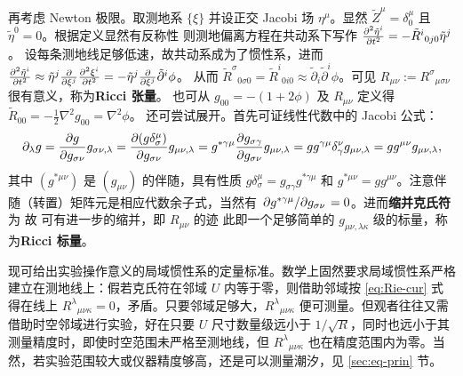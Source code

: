 再考虑 Newton 极限。取测地系 $\{\xi\}$ 并设正交 Jacobi 场 $\eta^\mu$。显然 $\tilde Z^\mu=\delta^\mu_0$ 且 $\tilde\eta^0=0$。根据定义显然有反称性
则测地偏离方程在共动系下写作 $\pdv[2]{\tilde\eta^i}{t}=-\tilde R^i{}_{0 j 0} \tilde\eta^j$。
设每条测地线足够低速，故共动系成为了惯性系，进而 $\pdv[2]{\tilde\eta^i}{t}\approx \tilde\eta^j \pdv{\xi^j}\pdv[2]{\xi^i}{t}=-\tilde\eta^j \pdv{\xi^j}\tilde{\partial}^i\phi$。
从而 $\tilde R^\sigma{}_{0 \sigma 0}=\tilde R^i{}_{0 i 0} \approx \tilde\partial_i\tilde\partial^i{\phi}$。可见 $R_{\mu\nu}:={R^\sigma}_{\mu\sigma\nu}$ 很有意义，称为\textbf{Ricci 张量}。
也可从 $g_{00}=-(1+2\phi)$ 及 $R_{\mu\nu}$ 定义得 $\tilde R_{00}=-\frac 12 \nabla^2 g_{00}=\nabla^2\phi$。
还可尝试展开。首先可证线性代数中的 Jacobi 公式：
\[
    \partial_\lambda g=\pdv{g}{g_{\sigma\nu}}g_{\sigma \nu,\lambda}=\pdv{(g\delta_\sigma^\mu)}{g_{\sigma\nu}}g_{\mu \nu,\lambda} =g^{*\gamma\mu}\pdv{g_{\sigma\gamma}}{g_{\sigma\nu}} g_{\mu \nu,\lambda}=gg^{\gamma\mu}\delta^\nu_\gamma g_{\mu \nu,\lambda}=g g^{\mu \nu} g_{\mu \nu,\lambda},
\]
其中 $(g^{*\mu\nu})$ 是 $(g_{\mu\nu})$ 的伴随，具有性质 $g\delta_\sigma^\mu=g_{\sigma\gamma}g^{*\gamma\mu}$ 和 $g^{*\mu\nu}=gg^{\mu\nu}$。注意伴随（转置）矩阵元是相应代数余子式，当然有 $\pdv*{g^{*\gamma\mu}}{g_{\sigma\nu}}=0$。进而\textbf{缩并克氏符}为
故
可有进一步的缩并，即 $R_{\mu\nu}$ 的迹
此即一个足够简单的 $g_{\mu\nu,\lambda\kappa}$ 级的标量，称为\textbf{Ricci 标量}。

现可给出实验操作意义的局域惯性系的定量标准。数学上固然要求局域惯性系严格建立在测地线上：假若克氏符在邻域 $U$ 内等于零，则借助邻域按 \eqref{eq:Rie-cur} 式得在线上 $R^\lambda{}_{\mu\nu\kappa}=0$，矛盾。只要邻域足够大，$R^\lambda{}_{\mu\nu\kappa}$ 便可测量。但观者往往又需借助时空邻域进行实验，好在只要 $U$ 尺寸数量级远小于 $1/\sqrt{R}$，同时也远小于其测量精度时，即使时空范围未严格至测地线，但 $R^\lambda{}_{\mu\nu\kappa}$ 也在精度范围内为零。当然，若实验范围较大或仪器精度够高，还是可以测量潮汐，见 \ref{sec:eq-prin} 节。

